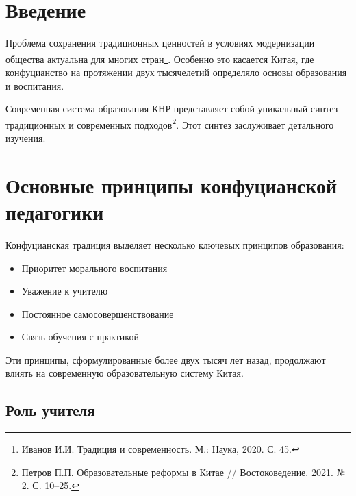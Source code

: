 \documentclass[12pt]{article}
\begin{document}


\vspace{1em}


\section{Введение}

Проблема сохранения традиционных ценностей в условиях 
модернизации общества актуальна для многих стран\footnote{Иванов И.И. 
Традиция и современность. М.: Наука, 2020. С. 45.}. Особенно это 
касается Китая, где конфуцианство на протяжении двух тысячелетий 
определяло основы образования и воспитания.

Современная система образования КНР представляет собой уникальный 
синтез традиционных и современных подходов\footnote{Петров П.П. 
Образовательные реформы в Китае // Востоковедение. 2021. № 2. 
С. 10--25.}. Этот синтез заслуживает детального изучения.

\section{Основные принципы конфуцианской педагогики}

Конфуцианская традиция выделяет несколько ключевых принципов образования:
\begin{itemize}
\item Приоритет морального воспитания
\item Уважение к учителю
\item Постоянное самосовершенствование
\item Связь обучения с практикой
\end{itemize}

Эти принципы, сформулированные более двух тысяч лет назад, 
продолжают влиять на современную образовательную систему Китая.

\subsection{Роль учителя}
\end{document}
